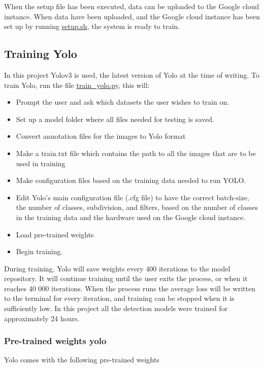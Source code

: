 When the setup file has been executed, data can be uploaded to the Google cloud instance. When data have been uploaded, and the Google cloud instance has been set up by running \url{setup.sh}, the system is ready to train.

\subsection{Training Yolo}
In this project Yolov3 is used, the latest version of Yolo at the time of writing. To train Yolo, run the file \url{train_yolo.py}, this will:

\begin{itemize}
    \item Prompt the user and ask which datasets the user wishes to train on.
    \item Set up a model folder where all files needed for testing is saved.
    \item Convert annotation files for the images to Yolo format
    \item Make a train.txt file which contains the path to all the images that are to be used in training
    \item Make configuration files based on the training data needed to run YOLO.
    \item Edit Yolo's main configuration file (.cfg file) to have the correct batch-size, the number of classes, subdivision, and filters, based on the number of classes in the training data and the hardware used on the Google cloud instance.
    \item Load pre-trained weights
    \item Begin training.
\end{itemize}

During training, Yolo will save weights every 400 iterations to the model repository. It will continue training until the user exits the process, or when it reaches 40 000 iterations. When the process runs the average loss will be written to the terminal for every iteration, and training can be stopped when it is sufficiently low. In this project all the detection models were trained for approximately 24 hours.

\newpage

\subsubsection{Pre-trained weights yolo}
Yolo comes with the following pre-trained weights

